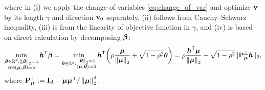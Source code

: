 where in (i) we apply the change of variables \cref{eq:change_of_var} and optimize $\bv$ by its length $\gamma$ and direction $\bv_0$ separately, (ii) follows from Cauchy--Schwarz inequality, (iii) is from the linearity of objective function in $\gamma$, and (iv) is based on direct calculation by decomposing $\vbeta$:
\begin{equation*}
    \min_{ \substack{ \vbeta \in \R^d: \norm{\vbeta}_2 = 1 \\ \cos(\vmu, \vbeta) = \rho } } \hh^\top\vbeta
    = \min_{ \vtheta \in \R^d: \substack{ \norm{\vtheta}_2 = 1 \\ \< \bmu, \vtheta \> = 0 } } \hh^\top 
    \biggl( \rho \frac{\bmu}{\norm{\vmu}_2} + \sqrt{1 - \rho^2} \vtheta \biggr)
    =  
    \rho \frac{\hh^\top \bmu}{\norm{\vmu}_2} - \sqrt{1 - \rho^2} \| \bP_{\bmu}^\perp \hh \|_2,
\end{equation*}
where $\bP_{\vmu}^\perp := \bI_d - \vmu \vmu^\top / \norm{\vmu}_2^2$.




